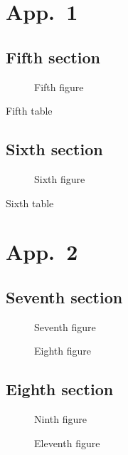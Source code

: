 \documentclass[12pt,a4paper]{report}
\begin{document}
\appendix
\chapter{App.~1}
\minitoc \mtcskip
\minilof \mtcskip
\minilot
\section{Fifth section}

\begin{figure} \caption{Fifth figure} \end{figure}
\begin{table} \caption{Fifth table} \end{table}

\section{Sixth section}

\begin{figure} \caption{Sixth figure} \end{figure}
\begin{table} \caption{Sixth table} \end{table}
\chapter{App.~2}
\minitoc \mtcskip
\minilof \mtcskip
\minilot
\section{Seventh section}
\begin{figure} \caption{Seventh figure} \end{figure}
\begin{figure} \caption{Eighth figure} \end{figure}

\section{Eighth section}

\begin{figure} \caption{Ninth figure} \end{figure}
\begin{figure} \caption{Eleventh figure} \end{figure}
\end{document}

